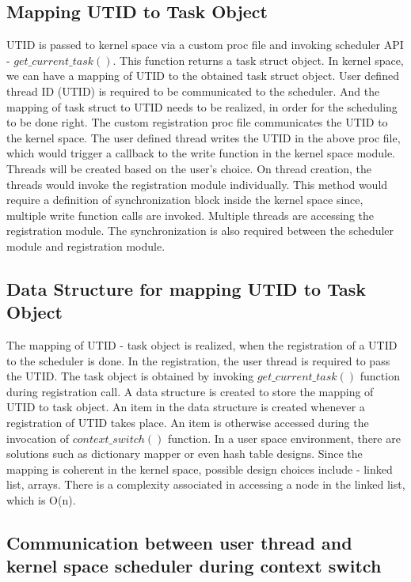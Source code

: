 \subsection{Mapping UTID to Task Object}

UTID  is passed to kernel space via a custom proc file and invoking scheduler API - $get\_current\_task()$. 
This function returns a task struct object. 
In kernel space, we can have a mapping of UTID to the obtained task struct object. 
User defined thread ID (UTID) is required to be communicated to the scheduler. 
And the mapping of task struct to UTID needs to be realized, in order for the scheduling to be done right. 
The custom registration proc file communicates the UTID to the kernel space. 
The user defined thread writes the UTID in the above proc file, which would trigger a callback to the write function in the kernel space module. 
Threads will be created based on the user's choice. 
On thread creation, the threads would invoke the registration module individually. 
This method would require a definition of synchronization block inside the kernel space since, multiple write function calls are invoked. 
Multiple threads are accessing the registration module. 
The synchronization is also required between the scheduler module and registration module.


\subsection{Data Structure for mapping UTID to Task Object}

The mapping of UTID - task object is realized, when the registration of a UTID to the scheduler is done. 
In the registration, the user thread is required to pass the UTID. 
The task object is obtained by invoking $get\_current\_task()$ function during registration call. 
A data structure is created to store the mapping of UTID to task object. 
An item in the data structure is created whenever a registration of UTID takes place. 
An item is otherwise accessed during the invocation of $context\_switch()$ function. 
In a user space environment, there are solutions such as dictionary mapper or even hash table designs. 
Since the mapping is coherent in the kernel space, possible design choices include - linked list, arrays. 
There is a complexity associated in accessing a node in the linked list, which is O(n).

\subsection{Communication between user thread and kernel space scheduler during context switch} 

